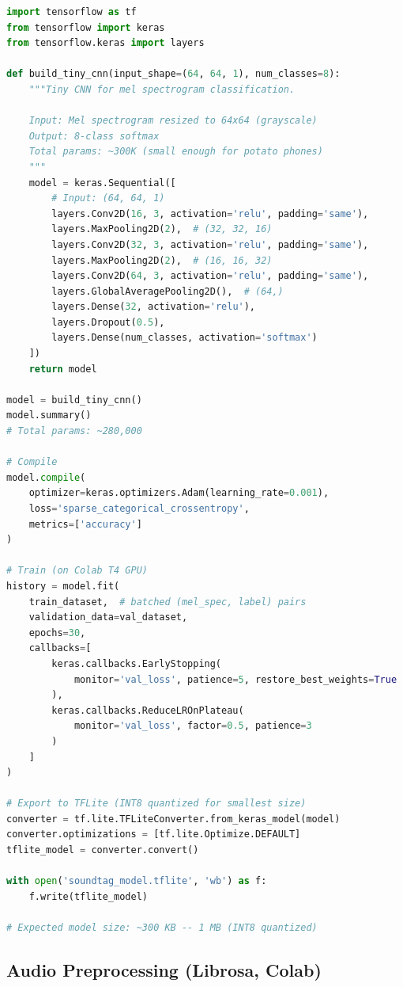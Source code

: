 \documentclass[11pt,a4paper]{article}
\begin{document}
\begin{lstlisting}[language=Python]
import tensorflow as tf
from tensorflow import keras
from tensorflow.keras import layers

def build_tiny_cnn(input_shape=(64, 64, 1), num_classes=8):
    """Tiny CNN for mel spectrogram classification.
    
    Input: Mel spectrogram resized to 64x64 (grayscale)
    Output: 8-class softmax
    Total params: ~300K (small enough for potato phones)
    """
    model = keras.Sequential([
        # Input: (64, 64, 1)
        layers.Conv2D(16, 3, activation='relu', padding='same'),
        layers.MaxPooling2D(2),  # (32, 32, 16)
        layers.Conv2D(32, 3, activation='relu', padding='same'),
        layers.MaxPooling2D(2),  # (16, 16, 32)
        layers.Conv2D(64, 3, activation='relu', padding='same'),
        layers.GlobalAveragePooling2D(),  # (64,)
        layers.Dense(32, activation='relu'),
        layers.Dropout(0.5),
        layers.Dense(num_classes, activation='softmax')
    ])
    return model

model = build_tiny_cnn()
model.summary()
# Total params: ~280,000

# Compile
model.compile(
    optimizer=keras.optimizers.Adam(learning_rate=0.001),
    loss='sparse_categorical_crossentropy',
    metrics=['accuracy']
)

# Train (on Colab T4 GPU)
history = model.fit(
    train_dataset,  # batched (mel_spec, label) pairs
    validation_data=val_dataset,
    epochs=30,
    callbacks=[
        keras.callbacks.EarlyStopping(
            monitor='val_loss', patience=5, restore_best_weights=True
        ),
        keras.callbacks.ReduceLROnPlateau(
            monitor='val_loss', factor=0.5, patience=3
        )
    ]
)

# Export to TFLite (INT8 quantized for smallest size)
converter = tf.lite.TFLiteConverter.from_keras_model(model)
converter.optimizations = [tf.lite.Optimize.DEFAULT]
tflite_model = converter.convert()

with open('soundtag_model.tflite', 'wb') as f:
    f.write(tflite_model)

# Expected model size: ~300 KB -- 1 MB (INT8 quantized)
\end{lstlisting}

\subsection{Audio Preprocessing (Librosa, Colab)}
\end{document}
